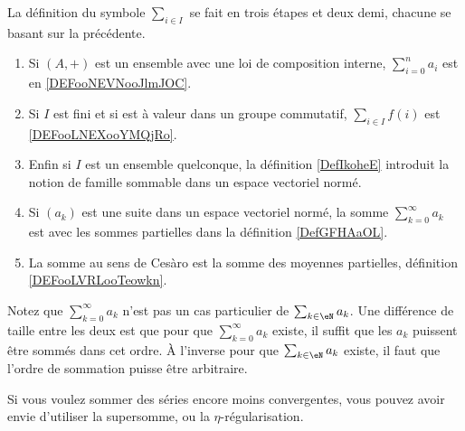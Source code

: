           \label{THEMEooMKLBooLGFCdx}
La définition du symbole \( \sum_{i\in I}\) se fait en trois étapes et deux demi, chacune se basant sur la précédente.
\begin{enumerate}
	\item
	      Si \( (A,+)\) est un ensemble avec une loi de composition interne, \( \sum_{i=0}^na_i\) est en \ref{DEFooNEVNooJlmJOC}.
	\item
	      Si \( I\) est fini et si est à valeur dans un groupe commutatif, \( \sum_{i\in I}f(i)\) est \ref{DEFooLNEXooYMQjRo}.
	\item
	      Enfin si \( I\) est un ensemble quelconque, la définition \ref{DefIkoheE} introduit la notion de famille sommable dans un espace vectoriel normé.
	\item
	      Si \( (a_k)\) est une suite dans un espace vectoriel normé, la somme \( \sum_{k=0}^{\infty}a_k\) est avec les sommes partielles dans la définition \ref{DefGFHAaOL}.
	\item
	      La somme au sens de Cesàro est la somme des moyennes partielles, définition \ref{DEFooLVRLooTeowkn}.
\end{enumerate}
Notez que \( \sum_{k=0}^{\infty}a_k\) n'est pas un cas particulier de \( \sum_{k\in \eN}a_k\). Une différence de taille entre les deux est que pour que \( \sum_{k=0}^{\infty}a_k\) existe, il suffit que les \( a_k\) puissent être sommés dans cet ordre. À l'inverse pour que \( \sum_{k\in \eN}a_k\) existe, il faut que l'ordre de sommation puisse être arbitraire.

Si vous voulez sommer des séries encore moins convergentes, vous pouvez avoir envie d'utiliser la supersomme\cite{BIBooUCSPooNKNWEK}, ou la \( \eta\)-régularisation\cite{BIBooLFLMooHFZFHu}.
